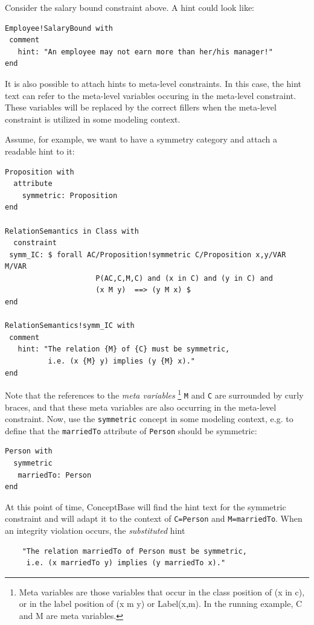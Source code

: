 Consider the salary bound constraint above. A hint could look like:

{\small
\begin{verbatim}
Employee!SalaryBound with
 comment
   hint: "An employee may not earn more than her/his manager!"
end
\end{verbatim}
}

It is also possible to attach hints to meta-level constraints.
In this case, the hint text can refer to the meta-level variables
occuring in the meta-level constraint. These variables will be
replaced by the correct fillers when the meta-level constraint is
utilized in some modeling context.

Assume, for example, we want to have a symmetry category and
attach a readable hint to it:

{\small
\begin{verbatim}
Proposition with
  attribute
    symmetric: Proposition
end

RelationSemantics in Class with
  constraint
 symm_IC: $ forall AC/Proposition!symmetric C/Proposition x,y/VAR M/VAR
                     P(AC,C,M,C) and (x in C) and (y in C) and
                     (x M y)  ==> (y M x) $
end

RelationSemantics!symm_IC with
 comment
   hint: "The relation {M} of {C} must be symmetric,
          i.e. (x {M} y) implies (y {M} x)."
end
\end{verbatim}
}

Note that the references to the {\em meta variables}%
\footnote{Meta variables are those variables that occur in the class position
of (x in c), or in the label position of (x m y) or Label(x,m). In the running example,
C and M are meta variables.}\/
 {\tt M} and {\tt C} are surrounded by curly braces,
and that these meta variables are also occurring in the meta-level constraint.
Now, use the {\tt symmetric} concept in some modeling context, e.g. to define
that the {\tt marriedTo} attribute of {\tt Person} should be symmetric:

{\small
\begin{verbatim}
Person with
  symmetric
   marriedTo: Person
end
\end{verbatim}
}

At this point of time, ConceptBase will find the hint text for the symmetric
constraint and will adapt it to the context of {\tt C=Person} and {\tt M=marriedTo}.
When an integrity violation occurs, the {\em substituted\/} hint

\begin{verbatim}
    "The relation marriedTo of Person must be symmetric,
     i.e. (x marriedTo y) implies (y marriedTo x)."
\end{verbatim}


